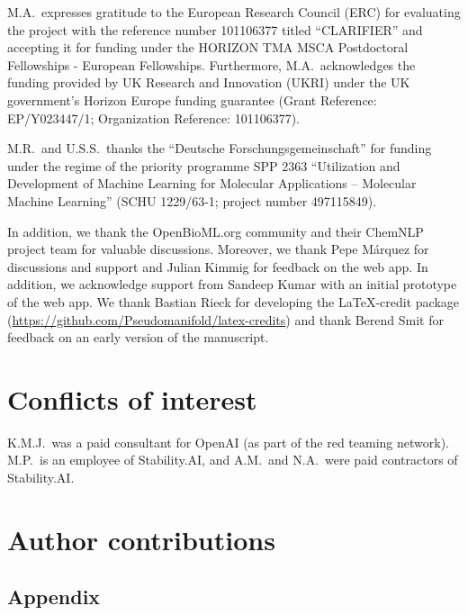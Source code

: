 \documentclass[11pt, oneside]{article}
\begin{document}
\begin{refsection}
M.A.\ expresses gratitude to the European Research Council (ERC) for evaluating the project with the reference number 101106377 titled \enquote{CLARIFIER} and accepting it for funding under the HORIZON TMA MSCA Postdoctoral Fellowships - European Fellowships. 
Furthermore, M.A.\ acknowledges the funding provided by UK Research and Innovation (UKRI) under the UK government’s Horizon Europe funding guarantee (Grant Reference: EP/Y023447/1; Organization Reference: 101106377).

M.R.\ and U.S.S.\ thanks the \enquote{Deutsche Forschungsgemeinschaft} for funding under the regime of the priority programme SPP 2363 \enquote{Utilization and Development of Machine Learning for Molecular Applications – Molecular Machine Learning} (SCHU 1229/63-1; project number 497115849).

In addition, we thank the OpenBioML.org community and their ChemNLP project team for valuable discussions.
Moreover, we thank Pepe Márquez for discussions and support and Julian Kimmig for feedback on the web app. 
In addition, we acknowledge support from Sandeep Kumar with an initial prototype of the web app.
We thank Bastian Rieck for developing the \LaTeX-credit package (\url{https://github.com/Pseudomanifold/latex-credits}) and thank Berend Smit for feedback on an early version of the manuscript.

\section*{Conflicts of interest}
K.M.J.\ was a paid consultant for OpenAI (as part of the red teaming network). M.P.\ is an employee of Stability.AI, and A.M.\ and N.A.\ were paid contractors of Stability.AI.

\section*{Author contributions}

\scriptsize
\insertcredits
\normalsize
\printbibliography
\end{refsection}

\clearpage
\begin{refsection}
\appendix
\section{Appendix}

\clearpage
\printbibliography[heading=subbibintoc]
\end{refsection}
\end{document}
